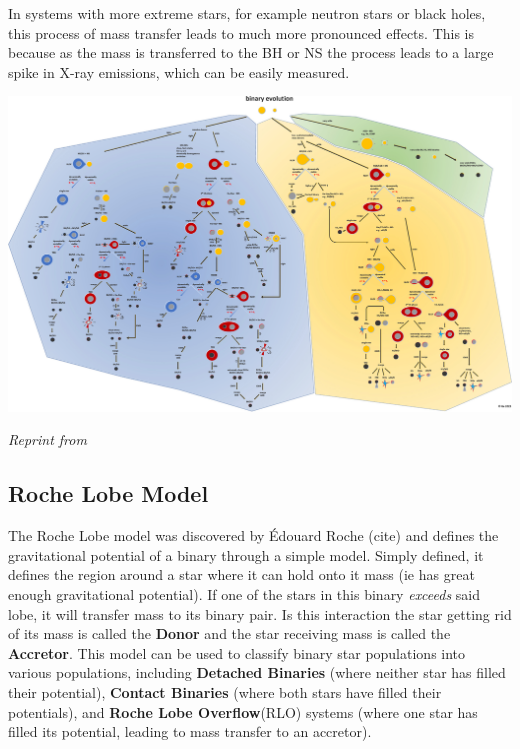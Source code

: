 \documentclass[12pt, letterpaper]{article}
\begin{document}
    In systems with more extreme stars, for example neutron stars or black holes, this process of mass transfer leads to much more pronounced effects. This is because as the mass is transferred to the BH or NS the process leads to a large spike in X-ray emissions, which can be easily measured.

    \begin{center}
        \includegraphics[width=\textwidth]{figs/Binary Evolution Flowchart.jpg}

        \textit{Reprint from}
    \end{center}


    
    \subsection{\centering Roche Lobe Model} %
    The Roche Lobe model was discovered by Édouard Roche (cite) and defines the gravitational potential of a binary through a simple model. Simply defined, it defines the region around a star where it can hold onto it mass (ie has great enough gravitational potential). If one of the stars in this binary \textit{exceeds} said lobe, it will transfer mass to its binary pair. Is this interaction the star getting rid of its mass is called the \textbf{Donor} and the star receiving mass is called the \textbf{Accretor}. This model can be used to classify binary star populations into various populations, including \textbf{Detached Binaries} (where neither star has filled their potential), \textbf{Contact Binaries} (where both stars have filled their potentials), and \textbf{Roche Lobe Overflow}(RLO) systems (where one star has filled its potential, leading to mass transfer to an accretor).
    
\end{document}

